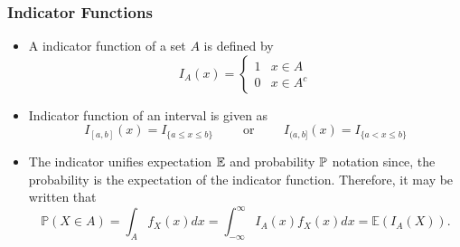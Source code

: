\subsubsection{Indicator Functions}
\begin{itemize}
    \item A indicator function of a set \(A\) is defined by 
    \[I_A(x) = \begin{cases}
        1 & x \in A \\
        0 & x \in A^c 
    \end{cases}\]
    \item Indicator function of an interval is given as 
    \[I_[a,b](x) = I_{\{a\leq x \leq b\}} \qquad \text{ or } \qquad I_{(a,b]}(x) = I_{\{a<x\leq b\}}\]
    \item The indicator unifies expectation \(\mathbb{E}\) and probability \(\mathbb{P}\) notation since, the probability is the expectation of the indicator function. Therefore, it may be written that 
\[
    \mathbb{P}(X\in A) = \int_{A} f_X(x)dx = \int_{-\infty}^{\infty} I_A(x) f_X(x) dx = \mathbb{E}(I_A(X))
.\]
\end{itemize}